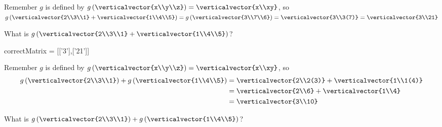 \documentclass{ximera}
\begin{document}
\begin{question}
\begin{solution}
\begin{hint}
\begin{question}
        	\begin{solution}
		\begin{hint}
			Remember $g$ is defined by $g\left( \verticalvector{x\\y\\z}\right) =\verticalvector{x\\xy}$, so
			$g\left( \verticalvector{2\\3\\1}+\verticalvector{1\\4\\5}\right) = g\left( \verticalvector{3\\7\\6}\right) = \verticalvector{3\\3(7)} =\verticalvector{3\\21}$
		\end{hint}
        	 What is $g\left( \verticalvector{2\\3\\1}+\verticalvector{1\\4\\5}\right)$?
        	 \begin{matrix-answer}[name=v]
    			  correctMatrix = [['3'],['21']]
        	 \end{matrix-answer}
        	\end{solution}
        	\begin{solution}
		\begin{hint}
			Remember $g$ is defined by $g\left( \verticalvector{x\\y\\z}\right) =\verticalvector{x\\xy}$, so
			\begin{align*}
			g\left( \verticalvector{2\\3\\1}\right)+g\left(\verticalvector{1\\4\\5}\right) &= \verticalvector{2\\2(3)}+\verticalvector{1\\1(4)}\\
			&=\verticalvector{2\\6}+\verticalvector{1\\4}\\
			&=\verticalvector{3\\10}
			\end{align*}
		\end{hint}
        	 What is $g\left(\verticalvector{2\\3\\1}\right)+g\left( \verticalvector{1\\4\\5}\right)$?

\end{solution}
\end{question}
\end{hint}
\end{solution}
\end{question}
\end{document}
